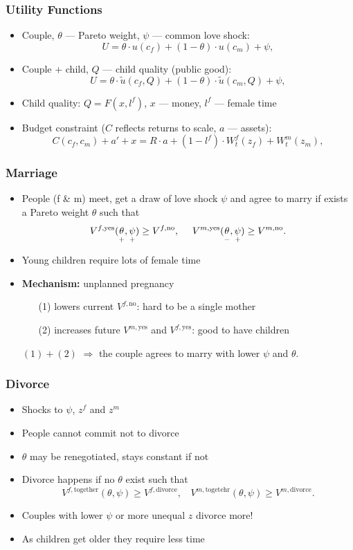\documentclass{beamer}
\begin{document}
\begin{frame}[label=utilities]
\frametitle{Utility Functions}
\begin{itemize}
\item Couple, $\theta$ --- Pareto weight, $\psi$ --- common love shock:
\[U = \theta \cdot u(c_f) + (1-\theta)\cdot u(c_m) + \psi,\]
\item Couple + child, $Q$ --- child quality (public good):
\[U = \theta \cdot \tilde{u}(c_f,Q) + (1-\theta)\cdot \tilde{u}(c_m,Q) + \psi,\]
\item Child quality: $Q = F(x,l^f)$, $x$ --- money, $l^f$ --- female time
\item Budget constraint ($C$ reflects returns to scale, $a$ --- assets):
 \[C(c_f,c_m) + a' + x = R\cdot a + (1-l^f)\cdot W^f_t(z_f) + W^m_t(z_m),\]
\end{itemize}
\hyperlink{value-functions}{}
\end{frame}


\begin{frame}
\frametitle{Marriage}
\begin{itemize}
\item People (f \& m) meet, get a draw of love shock $\psi$ and agree to marry if exists a Pareto weight $\theta$ such that
\[V^{f,\text{yes}}(\underset{\scriptsize +}{\theta\vphantom{\psi}},\underset{\scriptsize +}{\psi}) \geq V^{f,\text{no}}, \ \ \ \ V^{m,\text{yes}}(\underset{\scriptsize  -}{\theta\vphantom{\psi}},\underset{\scriptsize +}{\psi}) \geq V^{m,\text{no}}.\]
\item Young children require lots of female time
\item \textbf{Mechanism:} unplanned pregnancy 
\begin{enumerate}
\item[(1)] lowers current $V^{f,\text{no}}$: hard to be a single mother
\item[(2)] increases future $V^{m,\text{yes}}$ and $V^{f,\text{yes}}$: good to have children
\end{enumerate} 
$(1) + (2)$ $\Rightarrow$ the couple agrees to marry with lower $\psi$ and $\theta$.
\end{itemize}
\end{frame}

\begin{frame}
\frametitle{Divorce}
\begin{itemize}
\item Shocks to $\psi$, $z^f$ and $z^m$
\item People cannot commit not to divorce
\item $\theta$ may be renegotiated, stays constant if not
\item Divorce happens if no $\theta$ exist such that
\[V^{f,\text{together}}(\theta,\psi) \geq V^{f,\text{divorce}}, \ \ \ \ V^{m,\text{togetehr}}(\theta,\psi) \geq V^{m,\text{divorce}}.\]
\item Couples with lower $\psi$ or more unequal $z$ divorce more!
\item As children get older they require less time
\end{itemize}
\end{frame}
\end{document}

